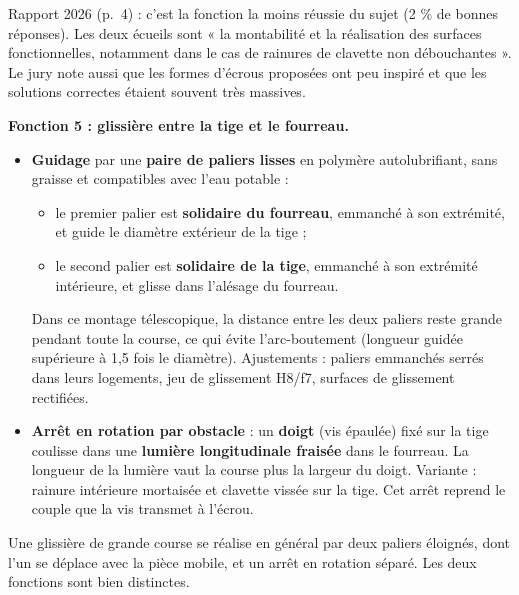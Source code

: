 \documentclass[11pt,a4paper]{article}
\providecommand{\tightlist}{\setlength{\itemsep}{0pt}\setlength{\parskip}{0pt}}
\begin{document}
\begin{jury}

Rapport 2026 (p.~4) : c'est la fonction la moins réussie du sujet (2 \% de bonnes réponses). Les deux écueils sont « la montabilité et la réalisation des surfaces fonctionnelles, notamment dans le cas de rainures de clavette non débouchantes ». Le jury note aussi que les formes d'écrous proposées ont peu inspiré et que les solutions correctes étaient souvent très massives.

\end{jury}

\textbf{Fonction 5 : glissière entre la tige et le fourreau.}

\begin{itemize}
\tightlist
\item
  \textbf{Guidage} par une \textbf{paire de paliers lisses} en polymère autolubrifiant, sans graisse et compatibles avec l'eau potable :

  \begin{itemize}
  \tightlist
  \item
    le premier palier est \textbf{solidaire du fourreau}, emmanché à son extrémité, et guide le diamètre extérieur de la tige ;
  \item
    le second palier est \textbf{solidaire de la tige}, emmanché à son extrémité intérieure, et glisse dans l'alésage du fourreau.
  \end{itemize}

  Dans ce montage télescopique, la distance entre les deux paliers reste grande pendant toute la course, ce qui évite l'arc-boutement (longueur guidée supérieure à 1,5 fois le diamètre). Ajustements : paliers emmanchés serrés dans leurs logements, jeu de glissement H8/f7, surfaces de glissement rectifiées.
\item
  \textbf{Arrêt en rotation par obstacle} : un \textbf{doigt} (vis épaulée) fixé sur la tige coulisse dans une \textbf{lumière longitudinale fraisée} dans le fourreau. La longueur de la lumière vaut la course plus la largeur du doigt. Variante : rainure intérieure mortaisée et clavette vissée sur la tige. Cet arrêt reprend le couple que la vis transmet à l'écrou.
\end{itemize}

\begin{methode}

Une glissière de grande course se réalise en général par deux paliers éloignés, dont l'un se déplace avec la pièce mobile, et un arrêt en rotation séparé. Les deux fonctions sont bien distinctes.

\end{methode}
\end{document}
